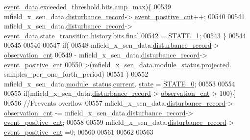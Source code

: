 \begin{DoxyCode}
      \hyperlink{a00028_a8c0bda69e71ef674e60da47ad0be9ab0}{event\_data}.exceeded\_threshold.bits.amp\_max)\{
00539                  mfield\_x\_sen\_data.\hyperlink{a00025_ac9b38e2c1d3f1013a88d33506c754152}{disturbance\_record}->
      \hyperlink{a00028_a7397b9d76d4b57500f27bb23d258a18a}{event\_positive\_cnt}++;
00540 
00541                 mfield\_x\_sen\_data.\hyperlink{a00025_ac9b38e2c1d3f1013a88d33506c754152}{disturbance\_record}->
      \hyperlink{a00028_a8c0bda69e71ef674e60da47ad0be9ab0}{event\_data}.state\_transition.history.bits.final
00542                 = \hyperlink{a00021_a727351838367f27ac0adb9a13422c342}{STATE\_1};
00543             \}
00544 
00545 
00546 
00547              \textcolor{keywordflow}{if}(
00548                     mfield\_x\_sen\_data.\hyperlink{a00025_ac9b38e2c1d3f1013a88d33506c754152}{disturbance\_record}->
      \hyperlink{a00028_ad5b0bac02ce266b91b2b52a1c3ea1d78}{observation\_cnt}
00549                   - mfield\_x\_sen\_data.\hyperlink{a00025_ac9b38e2c1d3f1013a88d33506c754152}{disturbance\_record}->
      \hyperlink{a00028_a7397b9d76d4b57500f27bb23d258a18a}{event\_positive\_cnt}
00550                   >(mfield\_x\_sen\_data.\hyperlink{a00025_adfab5a5d8b45a93dfb13edb24e2b80e3}{module\_status}.\hyperlink{a00019_af2267fb093fb5dcaa006a570a6da3b6b}{projected}.
      samples\_per\_one\_forth\_period)
00551                )
00552                  mfield\_x\_sen\_data.\hyperlink{a00025_adfab5a5d8b45a93dfb13edb24e2b80e3}{module\_status}.\hyperlink{a00019_acf41ffc11da291c2f9f0fcb02ee72b98}{current}.
      \hyperlink{a00019_a6b8d8e916bc56265a3fd279bd26b6d1b}{state} = \hyperlink{a00021_ad6739dbbe5581cac99b7dc8a5e09949c}{STATE\_0};
00553 
00554 
00555              \textcolor{keywordflow}{if}(mfield\_x\_sen\_data.\hyperlink{a00025_ac9b38e2c1d3f1013a88d33506c754152}{disturbance\_record}->
      \hyperlink{a00028_ad5b0bac02ce266b91b2b52a1c3ea1d78}{observation\_cnt} > 100)\{
00556              \textcolor{comment}{//Prevents overflow}
00557               mfield\_x\_sen\_data.\hyperlink{a00025_ac9b38e2c1d3f1013a88d33506c754152}{disturbance\_record}->
      \hyperlink{a00028_ad5b0bac02ce266b91b2b52a1c3ea1d78}{observation\_cnt}     -= mfield\_x\_sen\_data.\hyperlink{a00025_ac9b38e2c1d3f1013a88d33506c754152}{disturbance\_record}->
      \hyperlink{a00028_a7397b9d76d4b57500f27bb23d258a18a}{event\_positive\_cnt};
00558 
00559               mfield\_x\_sen\_data.\hyperlink{a00025_ac9b38e2c1d3f1013a88d33506c754152}{disturbance\_record}->
      \hyperlink{a00028_a7397b9d76d4b57500f27bb23d258a18a}{event\_positive\_cnt}   =0;
00560 
00561 
00562 
00563 

\end{DoxyCode}
